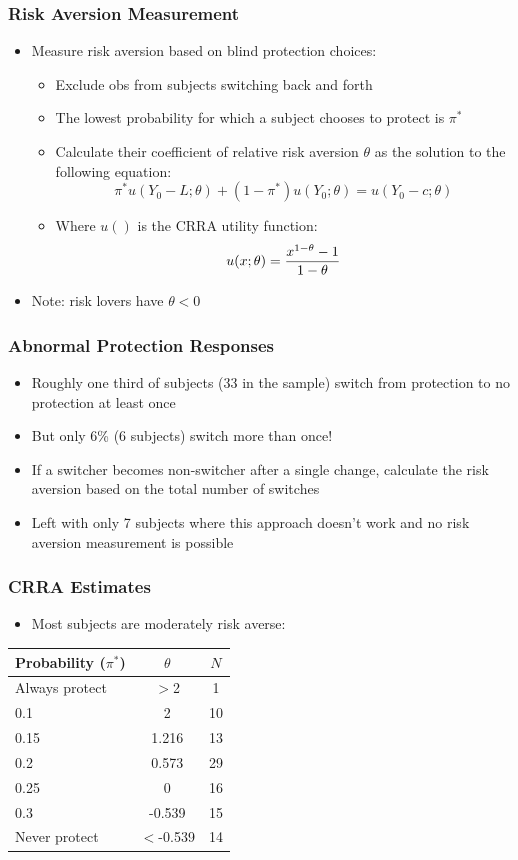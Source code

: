 \documentclass[11pt,hyperref={bookmarks=false}]{beamer}
\begin{document}
\fi


\begin{frame}
\frametitle{Risk Aversion Measurement}
\begin{itemize}
\item Measure risk aversion based on blind protection choices:
\begin{itemize}
\item Exclude obs from subjects switching back and forth
\item The lowest probability for which a subject chooses to protect is $\pi^*$
\item Calculate their coefficient of relative risk aversion $\theta$ as the solution to the following equation:
$$\pi^* u(Y_0-L;\theta)+(1-\pi^*)u(Y_0;\theta)=u(Y_0-c;\theta)$$
\item Where  $u()$ is the CRRA utility function:
$$u(x;\theta)={x^{1-\theta} -1 \over 1-\theta}$$
\end{itemize}
\item Note: risk lovers have $\theta<0$
\end{itemize}
\end{frame}


\begin{frame}
\frametitle{Abnormal Protection Responses}
\begin{itemize}
\item Roughly one third of subjects (33 in the sample) switch from protection to no protection at least once
\item But only 6\% (6 subjects) switch more than once!
\item If a switcher becomes non-switcher after a single change, calculate the risk aversion based on the total number of switches
\item Left with only 7 subjects where this approach doesn't work and no risk aversion measurement is possible
\end{itemize}
\end{frame}


\begin{frame}
\frametitle{CRRA Estimates}
\begin{itemize}
\item Most subjects are moderately risk averse: 
\end{itemize}
\begin{table}[htbp]\centering

\begin{tabular}{l c c}
\hline\hline
Probability ($\pi^*$) &                $\theta$ & $N$\\
\hline
Always protect & $>$2 &   1 \\
0.1 & 2 & 10 \\
0.15 & 1.216 & 13 \\
0.2 & 0.573 & 29 \\
0.25 & 0 & 16 \\
0.3 & -0.539 & 15 \\
Never protect & $<$-0.539 &  14 \\
\hline
\end{tabular}
\end{table}
\end{frame}
\end{document}
